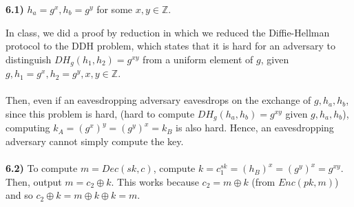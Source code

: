 \documentclass[12pt]{article}
\begin{document}
\noindent \textbf{6.1)} $h_a = g^x, h_b = g^y$ for some $x,y \in \mathbb{Z}$.

\noindent In class, we did a proof by reduction in which we reduced the Diffie-Hellman protocol to the DDH problem, which states that it is hard for an adversary to distinguish $DH_g(h_1,h_2) = g^{xy}$ from a uniform element of $g$, given $g, h_1=g^x, h_2=g^y, x,y \in \mathbb{Z}$.
\\
\\
\noindent Then, even if an eavesdropping adversary eavesdrops on the exchange of $g, h_a, h_b$, since this problem is hard, (hard to compute $DH_g(h_a,h_b) = g^{xy}$ given $g, h_a, h_b$), computing $k_A = (g^x)^y = (g^y)^x = k_B$ is also hard. Hence, an eavesdropping adversary cannot simply compute the key.
\\
\\
\noindent \textbf{6.2)} To compute $m = Dec(sk,c)$, compute $k = c_1^{sk} = (h_B)^x = (g^y)^x=g^{xy}$. Then, output $m = c_2 \oplus k$. This works because $c_2 = m \oplus k$ (from $Enc(pk,m)$) and so $c_2 \oplus k = m \oplus k \oplus k = m$.
\end{document}
